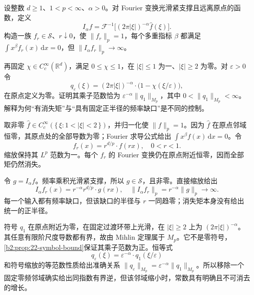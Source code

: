 \begin{exercise}\label{b2:ex:22-new-5}
设整数 \(d\geq1\)、\(1<p<\infty\)、\(\alpha>0\)。对 Fourier 变换光滑紧支撑且远离原点的函数，定义
\[
 I_\alpha f=\mathcal F^{-1}\bigl[(2\pi|\xi|)^{-\alpha}\widehat f(\xi)\bigr].
\]
构造一族 \(f_r\in\mathcal S\)、\(r\downarrow0\)，使 \(\|f_r\|_p=1\)，每个多重指标 \(\beta\) 都满足
\(\int x^\beta f_r(x)\,\mathrm dx=0\)，但 \(\|I_\alpha f_r\|_p\to\infty\)。

\ProseParagraphBreak

再固定 \(\chi\in C_c^\infty(\mathbb R^d)\)，满足 \(0\leq\chi\leq1\)，在 \(|\xi|\leq1\) 为一、\(|\xi|\geq2\) 为零。对 \(\varepsilon>0\) 令
\[
 q_\varepsilon(\xi)=(2\pi|\xi|)^{-\alpha}
                    \cdot\bigl(1-\chi(\xi/\varepsilon)\bigr),
\]
在原点定义为零。证明其乘子范数恰为
\(\varepsilon^{-\alpha}\|q_1\|_{M_p}\)，其中 \(0<\|q_1\|_{M_p}<\infty\)。解释为何“有消失矩”与“具有固定正半径的频率缺口”是不同的控制。
\end{exercise}
\begin{solution}
取非零 \(\widehat f\in C_c^\infty(\{\,\xi:1<|\xi|<2\,\})\)，并归一化使 \(\|f\|_p=1\)。因为 \(\widehat f\) 在原点邻域恒零，其原点处的全部导数为零；Fourier 求导公式给出
\(\int x^\beta f(x)\,\mathrm dx=0\)。令
\[
 f_r(x)=r^{d/p}\cdot f(rx),\quad 0<r<1.
\]
缩放保持其 \(L^p\) 范数为一。每个 \(f_r\) 的 Fourier 变换仍在原点附近恒零，因而全部矩仍然消失。

令 \(g=I_\alpha f\)。频率乘积光滑紧支撑，所以 \(g\in\mathcal S\)，且非零。直接缩放给出
\[
 I_\alpha f_r(x)=r^{-\alpha}r^{d/p}\cdot g(rx),
 \quad\|I_\alpha f_r\|_p=r^{-\alpha}\|g\|_p\longrightarrow\infty.
\]
每一个输入都有频率缺口，但该缺口的半径与 \(r\) 一同趋零；消失矩本身没有给出统一的正半径。

符号 \(q_1\) 在原点附近为零，在固定过渡环带上光滑，在 \(|\xi|\geq2\) 上为 \((2\pi|\xi|)^{-\alpha}\)。其任意有限阶尺度导数都有界，故由 Mihlin 定理属于 \(M_p\)。它不是零符号，\cref{b2:prop:22-symbol-bound}保证其乘子范数为正。恒等式
\[
 q_\varepsilon(\xi)=\varepsilon^{-\alpha}
                                  \cdot q_1(\xi/\varepsilon)
\]
和符号缩放的等范数性质给出准确关系
\(\|q_\varepsilon\|_{M_p}=\varepsilon^{-\alpha}\|q_1\|_{M_p}\)。所以移除一个固定零频邻域确实给出同指数有界逆，但该邻域缩小时，常数具有明确且不可消去的增长。
\end{solution}

